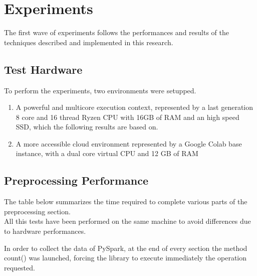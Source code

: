 \documentclass[
	letterpaper, %
	10pt, %
]{class}
\begin{document}



\section{Experiments}

The first wave of experiments follows the performances and results of the techniques described and implemented in this research.

\subsection{Test Hardware}

To perform the experiments, two environments were setupped.
\begin{enumerate}
    \item A powerful and multicore execution context, represented by a last generation 8 core and 16 thread Ryzen CPU with 16GB of RAM and an high speed SSD, which the following results are based on.
    \item A more accessible cloud environment represented by a Google Colab base instance, with a dual core virtual CPU and 12 GB of RAM
\end{enumerate}

\subsection{Preprocessing Performance}

The table below summarizes the time required to complete various parts of the preprocessing section.\\
All this tests have been performed on the same machine to avoid differences due to hardware performances.

In order to collect the data of PySpark, at the end of every section the method count() was launched, forcing the library to execute immediately the operation requested.\\
\end{document}
